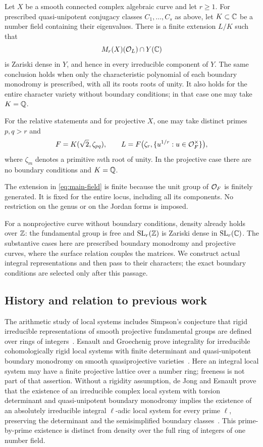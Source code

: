 \begin{theorem}\label{thm:main}
Let $X$ be a smooth connected complex algebraic curve and let $r\geq1$.
For prescribed quasi-unipotent conjugacy classes $C_1,\ldots,C_s$ as above,
let $K\subset\mathbb C$ be a number field containing their eigenvalues. There is
a finite extension $L/K$ such that
\[
 M_r(X)(\mathcal O_L)\cap Y(\mathbb C)
\]
is Zariski dense in $Y$, and hence in every irreducible component of $Y$.
The same conclusion holds when only the characteristic polynomial of
each boundary monodromy is prescribed, with all its roots roots of unity.
It also holds for the entire character variety without boundary
conditions; in that case one may take $K=\mathbb Q$.

For the relative statements and for projective $X$, one may take distinct
primes $p,q>r$ and
\begin{equation}\label{eq:main-field}
 F=K(\sqrt2,\zeta_{pq}),\qquad
 L=F\bigl(\zeta_r,\{u^{1/r}:u\in\mathcal O_F^\times\}\bigr),
\end{equation}
where $\zeta_m$ denotes a primitive $m$th root of unity. In the projective
case there are no boundary conditions and $K=\mathbb Q$.
\end{theorem}

The extension in \eqref{eq:main-field} is finite because the unit group
of $\mathcal O_F$ is finitely generated. It is fixed for the entire locus,
including all its components. No restriction on the genus or on the
Jordan forms is imposed.

For a nonprojective curve without boundary conditions, density already
holds over $\mathbb Z$: the fundamental group is free and $\operatorname{SL}_r(\mathbb Z)$ is
Zariski dense in $\operatorname{SL}_r(\mathbb C)$. The substantive cases here are prescribed
boundary monodromy and projective curves, where the surface relation
couples the matrices. We construct actual integral representations and
then pass to their characters; the exact boundary conditions are selected
only after this passage.

\subsection{History and relation to previous work}

The arithmetic study of local systems includes Simpson's conjecture
that rigid irreducible representations of smooth projective fundamental
groups are defined over rings of integers~\cite[p.~9]{Simpson1992}.
Esnault and Groechenig prove integrality for irreducible cohomologically
rigid local systems with finite determinant and quasi-unipotent boundary
monodromy on smooth quasiprojective varieties~\cite[Theorem~1.1]{EsnaultGroechenig2018}.
Here an integral local system may have a finite projective lattice over a
number ring; freeness is not part of that assertion.
Without a rigidity assumption, de Jong and Esnault prove that the
existence of an irreducible complex local system with torsion determinant
and quasi-unipotent boundary monodromy implies the existence of an
absolutely irreducible integral $\ell$-adic local system for every prime
$\ell$, preserving the determinant and the semisimplified boundary
classes~\cite[Theorem~1.1]{DeJongEsnault2024}.
This prime-by-prime existence is distinct from density over the full ring
of integers of one number field.

